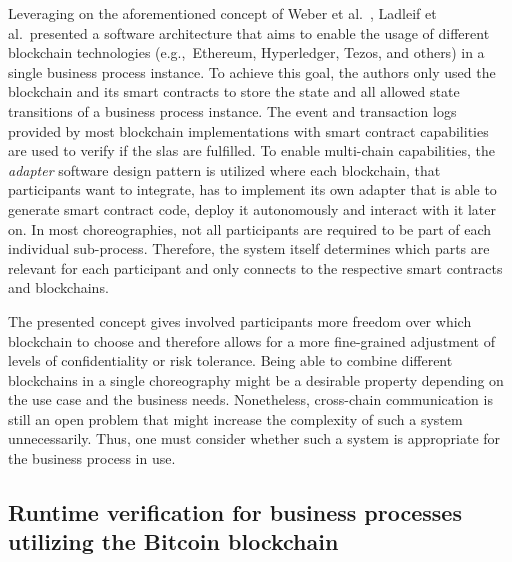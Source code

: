 Leveraging on the aforementioned concept of Weber et al.~\cite{untrusted_bp_execution_using_blockchain}, Ladleif et al.\ presented a software architecture that aims to enable the usage of different blockchain technologies (e.g.,\ Ethereum, Hyperledger, Tezos, and others) in a single business process instance. To achieve this goal, the authors only used the blockchain and its smart contracts to store the state and all allowed state transitions of a business process instance. The event and transaction logs provided by most blockchain implementations with smart contract capabilities are used to verify if the \glspl{sla} are fulfilled. To enable multi-chain capabilities, the \textit{adapter} software design pattern is utilized where each blockchain, that participants want to integrate, has to implement its own adapter that is able to generate smart contract code, deploy it autonomously and interact with it later on. In most choreographies, not all participants are required to be part of each individual sub-process. Therefore, the system itself determines which parts are relevant for each participant and only connects to the respective smart contracts and blockchains. 

The presented concept gives involved participants more freedom over which blockchain to choose and therefore allows for a more fine-grained adjustment of levels of confidentiality or risk tolerance. Being able to combine different blockchains in a single choreography might be a desirable property depending on the use case and the business needs. Nonetheless, cross-chain communication is still an open problem that might increase the complexity of such a system unnecessarily. Thus, one must consider whether such a system is appropriate for the business process in use.


\subsection{Runtime verification for business processes utilizing the Bitcoin blockchain~\cite{runtime_verification_for_bp_utilizing_bitcoin,prybila_master_thesis}}

